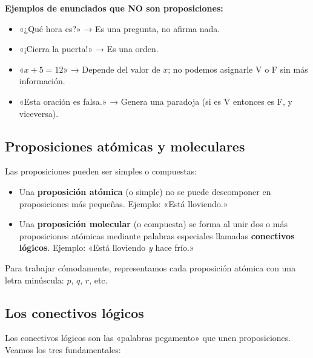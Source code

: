 \documentclass[12pt, a4paper]{article}
\begin{document}
\noindent\textbf{Ejemplos de enunciados que NO son proposiciones:}
\begin{itemize}[leftmargin=*]
  \item «¿Qué hora es?» → Es una pregunta, no afirma nada.
  \item «¡Cierra la puerta!» → Es una orden.
  \item «$x + 5 = 12$» → Depende del valor de $x$; no podemos asignarle V o F sin más información.
  \item «Esta oración es falsa.» → Genera una paradoja (si es V entonces es F, y viceversa).
\end{itemize}

\subsection{Proposiciones atómicas y moleculares}

Las proposiciones pueden ser simples o compuestas:

\begin{itemize}[leftmargin=*]
  \item Una \textbf{proposición atómica} (o simple) no se puede descomponer en proposiciones más pequeñas. Ejemplo: «Está lloviendo.»
  \item Una \textbf{proposición molecular} (o compuesta) se forma al unir dos o más proposiciones atómicas mediante palabras especiales llamadas \textbf{conectivos lógicos}. Ejemplo: «Está lloviendo \emph{y} hace frío.»
\end{itemize}

Para trabajar cómodamente, representamos cada proposición atómica con una letra minúscula: $p$, $q$, $r$, etc.

\subsection{Los conectivos lógicos}

Los conectivos lógicos son las «palabras pegamento» que unen proposiciones. Veamos los tres fundamentales:
\end{document}
